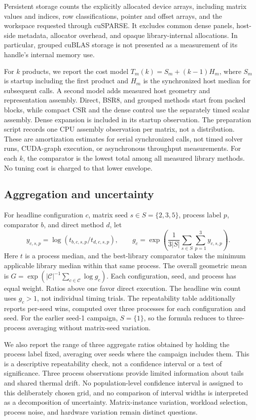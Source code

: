 \documentclass[10pt]{article}
\begin{document}
Persistent storage counts the explicitly allocated device arrays, including
matrix values and indices, row classifications, pointer and offset arrays,
and the workspace requested through cuSPARSE. It excludes common dense
panels, host-side metadata, allocator overhead, and opaque library-internal
allocations. In particular, grouped cuBLAS storage is not presented as a
measurement of its handle's internal memory use.

For \(k\) products, we report the cost model
\(T_m(k)=S_m+(k-1)H_m\), where \(S_m\) is startup including the first
product and \(H_m\) is the synchronized host median for subsequent calls.
A second model adds measured host geometry and representation assembly.
Direct, BSR8, and grouped methods start from packed blocks, while compact
CSR and the dense control use the separately timed scalar assembly.
Dense expansion is included in its startup observation. The preparation script
records one CPU assembly observation per matrix, not a distribution.
These are amortization estimates for serial synchronized calls, not timed
solver runs, CUDA-graph execution, or asynchronous throughput measurements.
For each \(k\), the comparator is the lowest total among all measured
library methods. No tuning cost is charged to that lower envelope.

\subsection{Aggregation and uncertainty}
For headline configuration \(c\), matrix seed \(s\in S=\{2,3,5\}\),
process label \(p\), comparator \(b\), and direct method \(d\), let
\[
 y_{c,s,p}=\log\left(t_{b,c,s,p}/t_{d,c,s,p}\right),\qquad
 g_c=\exp\left(\frac{1}{3|S|}\sum_{s\in S}\sum_{p=1}^{3}y_{c,s,p}\right).
\]
Here \(t\) is a process median, and the best-library comparator takes the
minimum applicable library median within that same process. The overall
geometric mean is
\(G=\exp(|\mathcal C|^{-1}\sum_{c\in\mathcal C}\log g_c)\).
Each configuration, seed, and process has equal weight. Ratios above one
favor direct execution. The headline win count uses \(g_c>1\), not
individual timing trials. The repeatability table additionally reports
per-seed wins, computed over three processes for each configuration and seed.
For the earlier seed-1 campaign, \(S=\{1\}\), so the formula reduces to
three-process averaging without matrix-seed variation.

We also report the range of three aggregate ratios obtained by holding the
process label fixed, averaging over seeds where the campaign includes them. This is a descriptive repeatability check, not a
confidence interval or a test of significance. Three process observations
provide limited information about tails and shared thermal drift. No
population-level confidence interval is assigned to this deliberately chosen
grid, and no comparison of interval widths is interpreted as a decomposition
of uncertainty. Matrix-instance variation, workload selection, process noise,
and hardware variation remain distinct questions.
\end{document}
